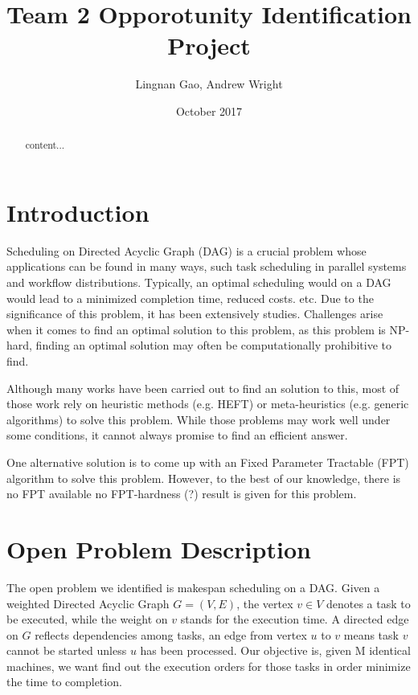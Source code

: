 \documentclass{article}
\title{Team 2 Opporotunity Identification Project}
\author{Lingnan Gao, Andrew Wright}
\date{October 2017}
\begin{document}
\maketitle
\begin{abstract}
	content...
\end{abstract}
\newcommand{\defproblem}[4]{%
  \hfill\\\smallskip\noindent%
  \begin{tabularx}{\textwidth}{|l X|}%
    \hline%
    \multicolumn{2}{|l|}{{#1}}\\%
    \textbf{Input:}&#2\\%
    \textbf{Question:}&#4\smallskip\\\hline%
  \end{tabularx}%
  \smallskip%
}%
\section{Introduction}
Scheduling on Directed Acyclic Graph (DAG) is a crucial problem whose 
applications can be found in many ways, such task scheduling in parallel 
systems and workflow distributions. Typically, an optimal scheduling 
would on a DAG would lead to a minimized completion time,
reduced costs. etc. Due to the significance of this problem, it has been 
extensively studies. Challenges arise when it comes to find an optimal solution 
to this problem, as this problem is NP-hard, finding an optimal solution may 
often be computationally prohibitive to find. 

Although many works have been carried out to find an solution to this, most 
of those work rely on heuristic methods (e.g. HEFT\cite{keylist}) or 
meta-heuristics (e.g. generic algorithms) to solve this problem. 
While those problems may work well under some conditions, 
it cannot always promise to find an efficient answer.  

One alternative solution is to come up with an Fixed Parameter Tractable 
(FPT)
algorithm to solve this problem. However, to the best of our knowledge,
there is no FPT available 
no FPT-hardness (?) result is given for this problem.

\section{Open Problem Description}
The open problem we identified is makespan scheduling on a DAG.
Given a weighted Directed Acyclic Graph $G=(V,E)$, the vertex
$v \in V$ denotes a task to be executed, while the weight on $v$ 
stands for the execution time. A directed edge on $G$ reflects
dependencies among tasks, an edge from vertex $u$ to $v$
means task $v$ cannot be started unless $u$ has been processed. 
Our objective is, given M identical machines, we want find out the execution
orders for those tasks in order minimize the time to completion.
\end{document}
